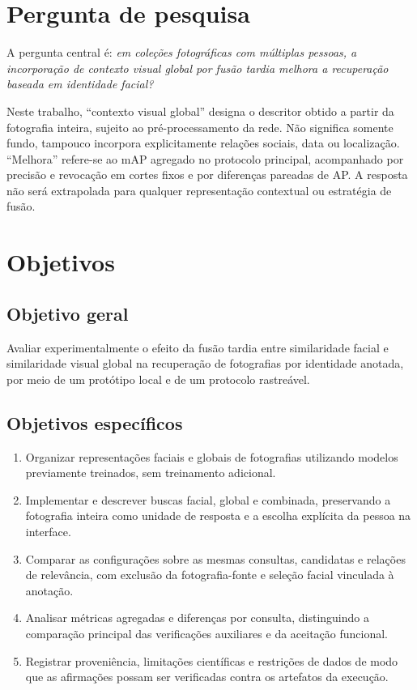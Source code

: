 \section{Pergunta de pesquisa}
A pergunta central é: \emph{em coleções fotográficas com múltiplas pessoas, a incorporação de contexto visual global por fusão tardia melhora a recuperação baseada em identidade facial?}

Neste trabalho, ``contexto visual global'' designa o descritor obtido a partir da fotografia inteira, sujeito ao pré-processamento da rede. Não significa somente fundo, tampouco incorpora explicitamente relações sociais, data ou localização. ``Melhora'' refere-se ao mAP agregado no protocolo principal, acompanhado por precisão e revocação em cortes fixos e por diferenças pareadas de AP. A resposta não será extrapolada para qualquer representação contextual ou estratégia de fusão.

\section{Objetivos}
\subsection{Objetivo geral}
Avaliar experimentalmente o efeito da fusão tardia entre similaridade facial e similaridade visual global na recuperação de fotografias por identidade anotada, por meio de um protótipo local e de um protocolo rastreável.

\subsection{Objetivos específicos}
\begin{enumerate}
\item Organizar representações faciais e globais de fotografias utilizando modelos previamente treinados, sem treinamento adicional.
\item Implementar e descrever buscas facial, global e combinada, preservando a fotografia inteira como unidade de resposta e a escolha explícita da pessoa na interface.
\item Comparar as configurações sobre as mesmas consultas, candidatas e relações de relevância, com exclusão da fotografia-fonte e seleção facial vinculada à anotação.
\item Analisar métricas agregadas e diferenças por consulta, distinguindo a comparação principal das verificações auxiliares e da aceitação funcional.
\item Registrar proveniência, limitações científicas e restrições de dados de modo que as afirmações possam ser verificadas contra os artefatos da execução.
\end{enumerate}

